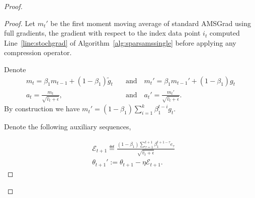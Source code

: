 \documentclass[11pt]{article}
\begin{document}
\begin{proof}
\begin{Theorem}
\end{Theorem}

\begin{proof}
Let $m_t'$ be the first moment moving average of standard AMSGrad using full gradients, \ie the gradient with respect to the index data point $i_t$ computed Line~\ref{line:stochgrad} of Algorithm~\ref{alg:sparsamssingle} before applying any compression operator.

Denote
\begin{align*}
m_t=\beta_1 m_{t-1}+(1-\beta_1)\tilde g_t \quad & \textrm{and} \quad m_t'=\beta_1 m_{t-1}'+(1-\beta_1) g_t\\
    a_t=\frac{m_t}{\sqrt{\hat v_t+\epsilon}},\quad & \textrm{and} \quad  a_t'=\frac{m_t'}{\sqrt{\hat v_t+\epsilon}}.
\end{align*}
By construction we have $m_t'=(1-\beta_1)\sum_{i=1}^k\beta_1^{t-i} g_t$. 

Denote the following auxiliary sequences,

\begin{align*}
& \mathcal E_{t+1}\eqdef \frac{(1-\beta_1)\sum_{\tau=1}^{t+1} \beta_1^{t+1-\tau} e_\tau}{\sqrt{\hat v_t+\epsilon}}\\
&\theta_{t+1}':=\theta_{t+1}-\eta\mathcal E_{t+1}.
\end{align*}


\end{proof}
\end{proof}
\end{document}
